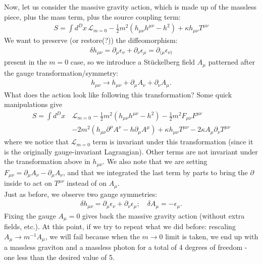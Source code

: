 \documentclass{book}
\theoremstyle{definition}
\newcommand{\p}{\partial}
\newcommand{\lag}{\mathcal{L}}
\newcommand{\nn}{\nonumber}
\newcommand{\f}[2]{\frac{#1}{#2}}
\newcommand{\lp}{\left(}
\newcommand{\rp}{\right)}
\begin{document}
Now, let us consider the massive gravity action, which is made up of the massless piece, plus the mass term, plus the source coupling term:
\begin{align}
\boxed{S = \int d^Dx\, \lag_{m=0} - \f{1}{2}m^2\lp h_{\mu\nu}h^{\mu\nu} - h^2 \rp + \kappa h_{\mu\nu}T^{\mu\nu}}
\end{align}
We want to preserve (or restore(?)) the diffeomorphism:
\begin{align}
\delta h_{\mu\nu} = \p_\mu \epsilon_\nu + \p_\nu \epsilon_\mu = \p_{(\mu}\epsilon_{\nu)}
\end{align}
present in the $m=0$ case, so we introduce a St\"{u}ckelberg field $A_\mu$ patterned after the gauge transformation/symmetry:
\begin{align}
h_{\mu\nu} \to h_{\mu\nu} + \p_\mu A_\nu + \p_\nu A_\mu.
\end{align}
What does the action look like following this transformation? Some quick manipulations give
\begin{align}\label{new-act}
S = \int d^Dx\, &\lag_{m=0} - \f{1}{2}m^2\lp h_{\mu\nu}h^{\mu\nu} - h^2 \rp - \f{1}{2}m^2 F_{\mu\nu}F^{\mu\nu}\nn\\
&-2m^2\lp h_{\mu\nu} \p^\mu A^\nu - h\p_\mu A^\mu \rp + \kappa h_{\mu\nu}T^{\mu\nu} - 2\kappa A_\mu \p_\nu T^{\mu\nu}
\end{align}
where we notice that $\lag_{m=0}$ term is invariant under this transformation (since it is the originally gauge-invariant Lagrangian). Other terms are not invariant under the transformation above in $h_{\mu\nu}$. We also note that we are setting $F_{\mu\nu} = \p_\mu A_\nu - \p_\mu A_\nu$, and that we integrated the last term by parts to bring the $\p$ inside to act on $T^{\mu\nu}$ instead of on $A_\mu$. \\

Just as before, we observe two gauge symmetries:
\begin{align}
\delta h_{\mu\nu} = \p_\mu \epsilon_\nu + \p_\nu \epsilon_\mu; \quad \delta A_\mu = -\epsilon_\mu.
\end{align}
Fixing the gauge $A_\mu = 0$ gives back the massive gravity action (without extra fields, etc.). At this point, if we try to repeat what we did before: rescaling $A_\mu \to m^{-1}A_\mu$, we will fail because when the $m\to 0$ limit is taken, we end up with a massless graviton and a massless photon for a total of 4 degrees of freedom - one less than the desired value of 5. \\
\end{document}
